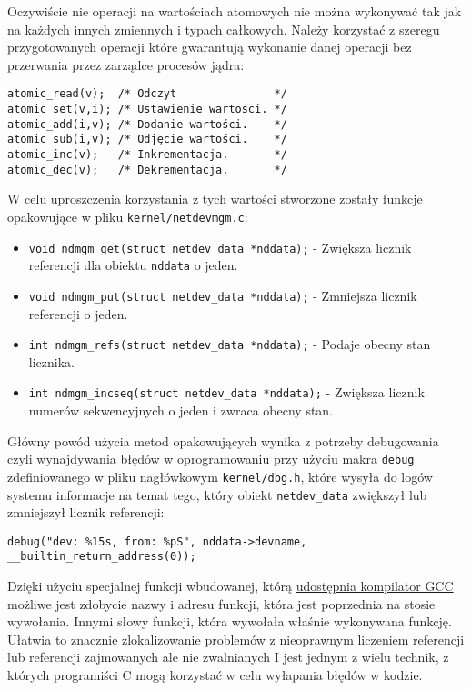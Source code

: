 Oczywiście nie operacji na wartościach atomowych nie można wykonywać tak
jak na każdych innych zmiennych i typach całkowych. Należy korzystać z
szeregu przygotowanych operacji które gwarantują wykonanie danej
operacji bez przerwania przez zarządce procesów jądra:

\begin{verbatim}
atomic_read(v);  /* Odczyt               */
atomic_set(v,i); /* Ustawienie wartości. */
atomic_add(i,v); /* Dodanie wartości.    */
atomic_sub(i,v); /* Odjęcie wartości.    */
atomic_inc(v);   /* Inkrementacja.       */
atomic_dec(v);   /* Dekrementacja.       */
\end{verbatim}

W celu uproszczenia korzystania z tych wartości stworzone zostały
funkcje opakowujące w pliku \texttt{kernel/netdevmgm.c}:

\begin{itemize}
\itemsep1pt\parskip0pt
\item
  \texttt{void ndmgm\_get(struct netdev\_data *nddata);} - Zwiększa
  licznik referencji dla obiektu \texttt{nddata} o jeden.
\item
  \texttt{void ndmgm\_put(struct netdev\_data *nddata);} - Zmniejsza
  licznik referencji o jeden.
\item
  \texttt{int ndmgm\_refs(struct netdev\_data *nddata);} - Podaje obecny
  stan licznika.
\item
  \texttt{int ndmgm\_incseq(struct netdev\_data *nddata);} - Zwiększa
  licznik numerów sekwencyjnych o jeden i zwraca obecny stan.
\end{itemize}

Główny powód użycia metod opakowujących wynika z potrzeby debugowania
czyli wynajdywania błędów w oprogramowaniu przy użyciu makra
\texttt{debug} zdefiniowanego w pliku nagłówkowym \texttt{kernel/dbg.h},
które wysyła do logów systemu informacje na temat tego, który obiekt
\texttt{netdev\_data} zwiększył lub zmniejszył licznik referencji:

\begin{verbatim}
debug("dev: %15s, from: %pS", nddata->devname, __builtin_return_address(0));
\end{verbatim}

Dzięki użyciu specjalnej funkcji wbudowanej, którą
\href{http://gcc.gnu.org/onlinedocs/gcc/Return-Address.html}{udostępnia
kompilator GCC} możliwe jest zdobycie nazwy i adresu funkcji, która jest
poprzednia na stosie wywołania. Innymi słowy funkcji, która wywołała
właśnie wykonywana funkcję. Ułatwia to znacznie zlokalizowanie problemów
z nieoprawnym liczeniem referencji lub referencji zajmowanych ale nie
zwalnianych I jest jednym z wielu technik, z których programiści C mogą
korzystać w celu wyłapania błędów w kodzie.

